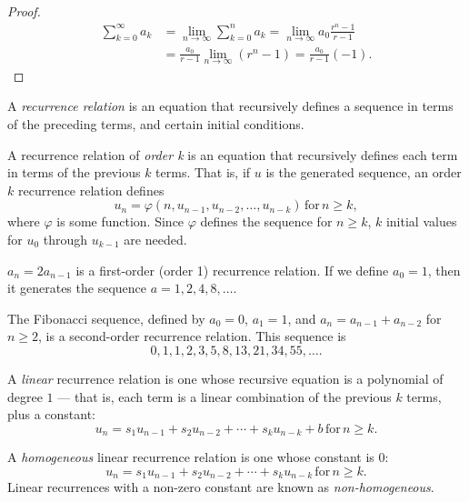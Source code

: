 \begin{proof}
    \begin{align*}
        \sum_{k=0}^{\infty}a_k &= \lim_{n \to\infty}\sum_{k=0}^{n}a_k = \lim_{n \to\infty}a_0\frac{r^n - 1}{r - 1} \\
        &= \frac{a_0}{r-1}\lim_{n \to\infty}\left(r^n - 1\right) = \frac{a_0}{r-1}\left(-1\right).
    \end{align*}
\end{proof}

\begin{defn}
    A \emph{recurrence relation} is an equation that recursively defines a sequence in terms of the preceding terms, and certain initial conditions.
\end{defn}

\begin{defn}
    A recurrence relation of \emph{order k} is an equation that recursively defines each term in terms of the previous $k$ terms. That is, if $u$ is the generated sequence, an order $k$ recurrence relation defines \[u_n = \varphi(n, u_{n-1}, u_{n-2}, \ldots, u_{n-k}) \,\textrm{for}\, n \geq k,\] where $\varphi$ is some function. Since $\varphi$ defines the sequence for $n \geq k$, $k$ initial values for $u_0$ through $u_{k-1}$ are needed.
\end{defn}

\begin{exmp}
    $a_n = 2a_{n-1}$ is a first-order (order 1) recurrence relation. If we define $a_0 = 1$, then it generates the sequence $a = 1, 2, 4, 8, \ldots$.
\end{exmp}

\begin{exmp}
    The Fibonacci sequence, defined by $a_0 = 0$, $a_1 = 1$, and $a_n = a_{n-1} + a_{n-2}$ for $n \geq 2$, is a second-order recurrence relation. This sequence is \[0, 1, 1, 2, 3, 5, 8, 13, 21, 34, 55, \ldots.\]
\end{exmp}

\begin{defn}
    A \emph{linear} recurrence relation is one whose recursive equation is a polynomial of degree $1$ --- that is, each term is a linear combination of the previous $k$ terms, plus a constant: \[u_n = s_1u_{n-1} + s_2u_{n-2} + \cdots + s_ku_{n-k} + b \,\textrm{for}\, n \geq k.\]
\end{defn}

\begin{defn}
    A \emph{homogeneous} linear recurrence relation is one whose constant is $0$: \[u_n = s_1u_{n-1} + s_2u_{n-2} + \cdots + s_ku_{n-k} \,\textrm{for}\, n \geq k.\] Linear recurrences with a non-zero constant are known as \emph{non-homogeneous}.
\end{defn}

